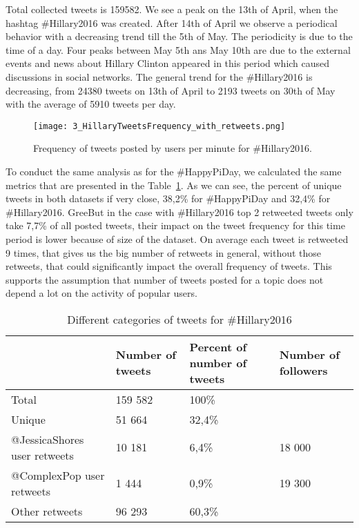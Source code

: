 \documentclass[journal, a4paper, 12pt]{article}
\begin{document}
Total collected tweets is 159582. We see a peak on the 13th of April, when the hashtag \#Hillary2016 was created. After 14th of April we observe a periodical behavior with a decreasing trend till the 5th of May. The periodicity is due to the time of a day. Four peaks between May 5th ans May 10th are due to the external events and news about Hillary Clinton appeared in this period which caused discussions in social networks. The general trend for the \#Hillary2016 is decreasing, from 24380 tweets on 13th of April to 2193 tweets on 30th of May with the average of 5910 tweets per day. 

    
      \begin{figure}[!hbt]
            \begin{center}
            \texttt{[image: 3\_HillaryTweetsFrequency\_with\_retweets.png]}
            \caption{Frequency of tweets posted by users per minute for \#Hillary2016.}
            \label{fig:hillary_freq_tweets}
            \end{center}
      \end{figure}
    
To conduct the same analysis as for the \#HappyPiDay, we calculated the same metrics that are presented in the Table~\ref{tab:numberoftweets_hillary}. As we can see, the percent of unique tweets in both datasets if very close, 38,2\% for \#HappyPiDay and 32,4\% for \#Hillary2016. GreeBut in the case with \#Hillary2016 top 2 retweeted tweets only take 7,7\% of all posted tweets, their impact on the tweet frequency for this time period is lower because of size of the dataset. On average each tweet is retweeted 9 times, that gives us the big number of retweets in general, without those retweets, that could significantly impact the overall frequency of tweets. This supports the assumption that number of tweets posted for a topic does not depend a lot on the activity of popular users.
      
    \begin{table}[!hbt]
            \begin{center}
            \caption{Different categories of tweets for \#Hillary2016}
            \label{tab:numberoftweets_hillary}
            \begin{tabular}{|p{4cm}|p{2cm}|p{2cm}|p{2cm}|}
                  \hline
                   & Number of tweets & Percent of number of tweets & Number of followers \\
            \hline
                  Total & 159 582 & 100\% & \\
                  \hline
                  Unique & 51 664  &  32,4\%  & \\
                  \hline
                  @JessicaShores user retweets & 10 181 & 6,4\% & 18 000\\
            \hline
            @ComplexPop user retweets & 1 444 & 0,9\% & 19 300\\
                  \hline
            Other retweets & 96 293 & 60,3\% &\\
                  \hline
            \end{tabular}
            \end{center}
      \end{table}
    
\end{document}
